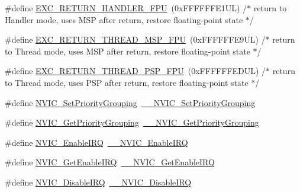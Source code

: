 \begin{DoxyCompactItemize}
\item 
\#define \hyperlink{group___c_m_s_i_s___core___n_v_i_c_functions_ga3aa6648e1c3c09fbab1f543b9dcffc3a}{E\+X\+C\+\_\+\+R\+E\+T\+U\+R\+N\+\_\+\+H\+A\+N\+D\+L\+E\+R\+\_\+\+F\+PU}~(0x\+F\+F\+F\+F\+F\+F\+E1\+U\+L)     /$\ast$ return to Handler mode, uses M\+S\+P after return, restore floating-\/point state $\ast$/
\item 
\#define \hyperlink{group___c_m_s_i_s___core___n_v_i_c_functions_gaad4cb3b34fd4264ccfae1fbbc75a3431}{E\+X\+C\+\_\+\+R\+E\+T\+U\+R\+N\+\_\+\+T\+H\+R\+E\+A\+D\+\_\+\+M\+S\+P\+\_\+\+F\+PU}~(0x\+F\+F\+F\+F\+F\+F\+E9\+U\+L)     /$\ast$ return to Thread mode, uses M\+S\+P after return, restore floating-\/point state  $\ast$/
\item 
\#define \hyperlink{group___c_m_s_i_s___core___n_v_i_c_functions_gadd2299e1d3a79c90b610c6b6f4cadb95}{E\+X\+C\+\_\+\+R\+E\+T\+U\+R\+N\+\_\+\+T\+H\+R\+E\+A\+D\+\_\+\+P\+S\+P\+\_\+\+F\+PU}~(0x\+F\+F\+F\+F\+F\+F\+E\+D\+U\+L)     /$\ast$ return to Thread mode, uses P\+S\+P after return, restore floating-\/point state  $\ast$/
\item 
\#define \hyperlink{group___c_m_s_i_s___core___n_v_i_c_functions_ga0e798d5aec68cdd8263db86a76df788f}{N\+V\+I\+C\+\_\+\+Set\+Priority\+Grouping}~\hyperlink{group___c_m_s_i_s___core___n_v_i_c_functions_gafc94dcbaee03e4746ade1f5bb9aaa56d}{\+\_\+\+\_\+\+N\+V\+I\+C\+\_\+\+Set\+Priority\+Grouping}
\item 
\#define \hyperlink{group___c_m_s_i_s___core___n_v_i_c_functions_ga4eeb9214f2264fc23c34ad5de2d3fa11}{N\+V\+I\+C\+\_\+\+Get\+Priority\+Grouping}~\hyperlink{group___c_m_s_i_s___core___n_v_i_c_functions_ga9b894af672df4373eb637f8288845c05}{\+\_\+\+\_\+\+N\+V\+I\+C\+\_\+\+Get\+Priority\+Grouping}
\item 
\#define \hyperlink{group___c_m_s_i_s___core___n_v_i_c_functions_ga57b3064413dbc7459d9646020fdd8bef}{N\+V\+I\+C\+\_\+\+Enable\+I\+RQ}~\hyperlink{group___c_m_s_i_s___core___n_v_i_c_functions_ga71227e1376cde11eda03fcb62f1b33ea}{\+\_\+\+\_\+\+N\+V\+I\+C\+\_\+\+Enable\+I\+RQ}
\item 
\#define \hyperlink{group___c_m_s_i_s___core___n_v_i_c_functions_ga857de13232ec65dd15087eaa15bc4a69}{N\+V\+I\+C\+\_\+\+Get\+Enable\+I\+RQ}~\hyperlink{group___c_m_s_i_s___core___n_v_i_c_functions_gaaeb5e7cc0eaad4e2817272e7bf742083}{\+\_\+\+\_\+\+N\+V\+I\+C\+\_\+\+Get\+Enable\+I\+RQ}
\item 
\#define \hyperlink{group___c_m_s_i_s___core___n_v_i_c_functions_ga73b4e251f59cab4e9a5e234aac02ae57}{N\+V\+I\+C\+\_\+\+Disable\+I\+RQ}~\hyperlink{group___c_m_s_i_s___core___n_v_i_c_functions_gae016e4c1986312044ee768806537d52f}{\+\_\+\+\_\+\+N\+V\+I\+C\+\_\+\+Disable\+I\+RQ}

\end{DoxyCompactItemize}
